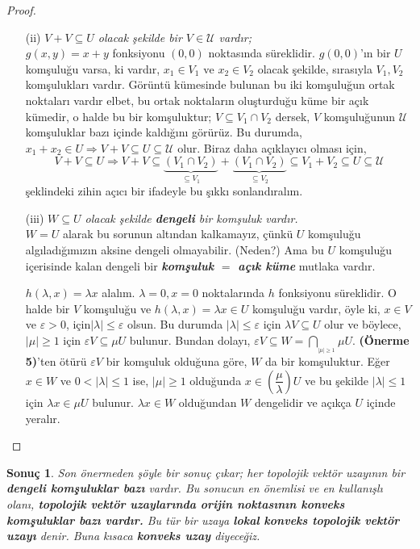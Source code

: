 \documentclass[11pt]{article}
\theoremstyle{plain}
\newtheorem{corollary}{Sonuç}
\theoremstyle{definition}
\theoremstyle{remark}
\numberwithin{equation}{section}
\renewcommand{\%}{{\small \%}}
\begin{document}
\begin{proof}
\begin{itemize}
\item[(ii)]\emph{$V+V\subseteq U$ olacak şekilde bir $V\in\mathscr{U}$ vardır;}\\
$g(x,y)=x+y$ fonksiyonu $(0,0)$ noktasında süreklidir. $g(0,0)$'ın bir $U$ komşuluğu varsa, ki vardır, $x_1 \in V_1 \text{ ve }x_2 \in V_2$ olacak şekilde, sırasıyla $V_1 ,V_2$ komşulukları vardır. Görüntü kümesinde bulunan bu iki komşuluğun ortak noktaları vardır elbet, bu ortak noktaların oluşturduğu küme bir açık kümedir, o halde bu bir komşuluktur; $V\subseteq V_1\cap V_2$ dersek, $V$ komşuluğunun $\mathscr{U}$ komşuluklar bazı içinde kaldığını görürüz. Bu durumda, $x_1 +x_2 \in U\Rightarrow V+V\subseteq U\subseteq\mathscr{U}$ olur. Biraz daha açıklayıcı olması için,
\[
V+V\subseteq U \Longrightarrow V+V\subseteq \underbrace{\left(V_1 \cap V_2\right)}_{\subseteq V_1}+\underbrace{\left(V_1 \cap V_2\right)}_{\subseteq V_2}\subseteq V_1 +V_2 \subseteq U\subseteq \mathscr{U}
\]
şeklindeki zihin açıcı bir ifadeyle bu şıkkı sonlandıralım.

\item[(iii)] \emph{$W\subseteq U$ olacak şekilde \textbf{dengeli} bir komşuluk vardır.}\\
$W=U$ alarak bu sorunun altından kalkamayız, çünkü $U$ komşuluğu algıladığımızın aksine dengeli olmayabilir. (Neden?) Ama bu $U$ komşuluğu içerisinde kalan dengeli bir \emph{\textbf{komşuluk $=$ açık küme}} mutlaka vardır. 

$h(\lambda ,x)=\lambda x$ alalım.  $\lambda =0, x=0$ noktalarında $h$ fonksiyonu süreklidir. O halde bir $V$ komşuluğu ve $h(\lambda ,x)=\lambda x\in U$ komşuluğu vardır, öyle ki, $x\in V$ ve $\varepsilon>0$, için$|\lambda|\leq\varepsilon$ olsun. Bu durumda $|\lambda|\leq\varepsilon$ için $\lambda V\subseteq U$ olur ve böylece, $|\mu|\geq 1$ için $\varepsilon V\subseteq\mu U$ bulunur. Bundan dolayı, $\varepsilon V\subseteq W=\underset{_{|\mu|\geq 1}}\bigcap\mu U$. \textbf{(Önerme 5)}'ten ötürü $\varepsilon V$ bir komşuluk olduğuna göre, $W$ da bir komşuluktur. Eğer $x\in W$ ve $0<|\lambda|\leq 1$ ise, $|\mu|\geq 1$ olduğunda $x\in\left(\dfrac{\mu}{\lambda}\right)U$ ve bu şekilde $|\lambda|\leq 1$ için $\lambda x\in\mu U$ bulunur. $\lambda x\in W$ olduğundan $W$ dengelidir ve açıkça $U$ içinde yeralır.
\end{itemize}
\end{proof}

\begin{corollary}
Son önermeden şöyle bir sonuç çıkar; her topolojik vektör uzayının bir \textbf{dengeli komşuluklar bazı} vardır. Bu sonucun en önemlisi ve en kullanışlı olanı, \textbf{topolojik vektör uzaylarında orijin noktasının konveks komşuluklar bazı vardır.} Bu tür bir uzaya \textbf{lokal konveks topolojik vektör uzayı} denir. Buna kısaca \textbf{\emph{konveks uzay}} diyeceğiz.\newpage
\end{corollary}
\end{document}
